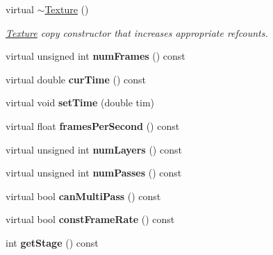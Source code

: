 \begin{DoxyCompactItemize}
\item 
virtual \hyperlink{classTexture_a09c4bcb7462f64c1d20fa69dba3cee8a}{$\sim$\+Texture} ()
\begin{DoxyCompactList}\small\item\em \hyperlink{classTexture}{Texture} copy constructor that increases appropriate refcounts. \end{DoxyCompactList}\item 
virtual unsigned int {\bfseries num\+Frames} () const \hypertarget{classTexture_a7712a1c9134f080fc43d2c5b16bd94b5}{}\label{classTexture_a7712a1c9134f080fc43d2c5b16bd94b5}

\item 
virtual double {\bfseries cur\+Time} () const \hypertarget{classTexture_a8f6192089c6b5f04ba046a010bc53afc}{}\label{classTexture_a8f6192089c6b5f04ba046a010bc53afc}

\item 
virtual void {\bfseries set\+Time} (double tim)\hypertarget{classTexture_ab8f40937156cac9d36d16e64a5ce2194}{}\label{classTexture_ab8f40937156cac9d36d16e64a5ce2194}

\item 
virtual float {\bfseries frames\+Per\+Second} () const \hypertarget{classTexture_a0a34172dfe3326baa5bf0e59dda7b2c9}{}\label{classTexture_a0a34172dfe3326baa5bf0e59dda7b2c9}

\item 
virtual unsigned int {\bfseries num\+Layers} () const \hypertarget{classTexture_a1137cd82c92f457e46debd7472947852}{}\label{classTexture_a1137cd82c92f457e46debd7472947852}

\item 
virtual unsigned int {\bfseries num\+Passes} () const \hypertarget{classTexture_a79f2e10209e75f5c3587ce789f2319f1}{}\label{classTexture_a79f2e10209e75f5c3587ce789f2319f1}

\item 
virtual bool {\bfseries can\+Multi\+Pass} () const \hypertarget{classTexture_ad69491cb5a9f9af2c33db44126185ad8}{}\label{classTexture_ad69491cb5a9f9af2c33db44126185ad8}

\item 
virtual bool {\bfseries const\+Frame\+Rate} () const \hypertarget{classTexture_a88e17a2c2e99b8053ec65fd5ef980bdf}{}\label{classTexture_a88e17a2c2e99b8053ec65fd5ef980bdf}

\item 
int {\bfseries get\+Stage} () const \hypertarget{classTexture_a446c438652b64c3fd33af5cf6e22608e}{}\label{classTexture_a446c438652b64c3fd33af5cf6e22608e}


\end{DoxyCompactItemize}
